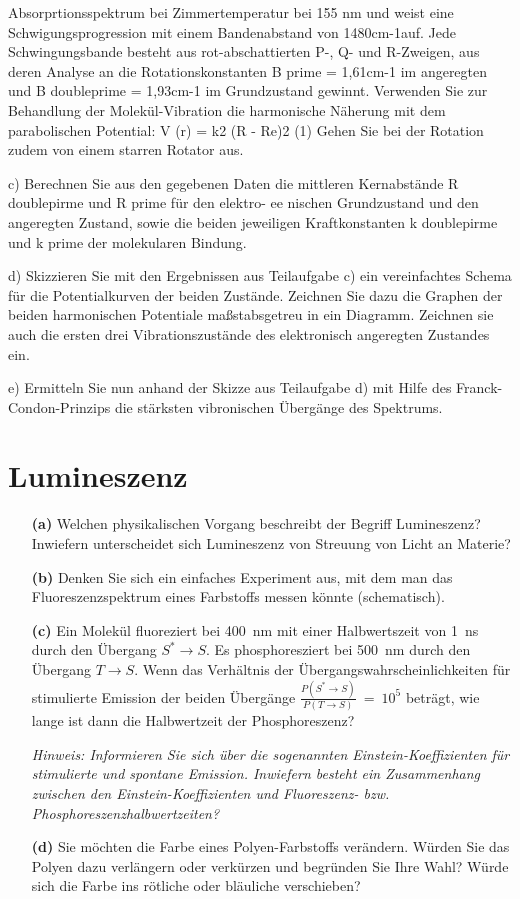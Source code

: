 Absorprtionsspektrum bei Zimmertemperatur bei 155 nm und weist eine Schwigungsprogression mit einem Bandenabstand von 1480cm-1auf. Jede Schwingungsbande besteht aus rot-abschattierten P-, Q- und R-Zweigen, aus deren Analyse an die Rotationskonstanten B prime = 1,61cm-1 im angeregten und B doubleprime = 1,93cm-1 im Grundzustand gewinnt. Verwenden Sie zur Behandlung der Molekül-Vibration die harmonische Näherung mit dem parabolischen Potential:
V (r) = k2 (R - Re)2 (1) Gehen Sie bei der Rotation zudem von einem starren Rotator aus.

c) Berechnen Sie aus den gegebenen Daten die mittleren Kernabstände R doublepirme und R prime  für den elektro- ee
nischen Grundzustand und den angeregten Zustand, sowie die beiden jeweiligen Kraftkonstanten k doublepirme und k prime der molekularen Bindung.

d) Skizzieren Sie mit den Ergebnissen aus Teilaufgabe c) ein vereinfachtes Schema für die Potentialkurven der beiden Zustände. Zeichnen Sie dazu die Graphen der beiden harmonischen Potentiale maßstabsgetreu in ein Diagramm. Zeichnen sie auch die ersten drei Vibrationszustände des elektronisch angeregten Zustandes ein.

e) Ermitteln Sie nun anhand der Skizze aus Teilaufgabe d) mit Hilfe des Franck-Condon-Prinzips die stärksten vibronischen Übergänge des Spektrums.


\section{Lumineszenz}


\begin{itemize}

\item[\textbf{(a)}] Welchen physikalischen Vorgang beschreibt der Begriff Lumineszenz? Inwiefern unterscheidet sich Lumineszenz von Streuung von Licht an Materie?
\item[\textbf{(b)}] Denken Sie sich ein einfaches Experiment aus, mit dem man das Fluoreszenzspektrum eines Farbstoffs messen könnte (schematisch).  
\item[\textbf{(c)}] Ein Molekül fluoreziert bei 400~nm mit einer Halbwertszeit von 1~ns durch den Übergang $S^* \rightarrow S$. Es phosphoresziert bei 500~nm durch den Übergang $T \rightarrow S$. Wenn das Verhältnis der Übergangswahrscheinlichkeiten für stimulierte Emission der beiden Übergänge $\frac{P(S^* \rightarrow S)}{P(T \rightarrow S)}~=~10^5$ beträgt, wie lange ist dann die Halbwertzeit der Phosphoreszenz?

\textit{Hinweis: Informieren Sie sich über die sogenannten Einstein-Koeffizienten für stimulierte und spontane Emission. Inwiefern besteht ein Zusammenhang zwischen den Einstein-Koeffizienten und Fluoreszenz- bzw. Phosphoreszenzhalbwertzeiten?}
 
\item[\textbf{(d)}] Sie möchten die Farbe eines Polyen-Farbstoffs verändern. Würden Sie das Polyen dazu verlängern oder verkürzen und begründen Sie Ihre Wahl? Würde sich die Farbe ins rötliche oder bläuliche verschieben? 
	
\end{itemize}



